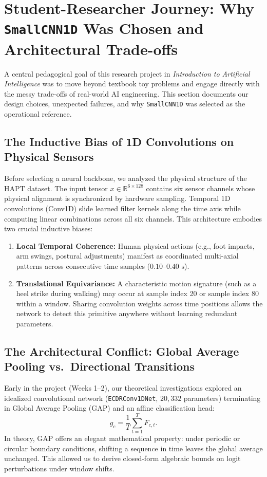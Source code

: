 \documentclass[journal,onecolumn,10pt]{IEEEtran}
\newcommand{\R}{\mathbb{R}}
\newcommand{\code}[1]{{\small\ttfamily\nolinkurl{#1}}}
\theoremstyle{remark}
\begin{document}
\section{Student-Researcher Journey: Why \code{SmallCNN1D} Was Chosen and Architectural Trade-offs}
A central pedagogical goal of this research project in \textit{Introduction to Artificial Intelligence} was to move beyond textbook toy problems and engage directly with the messy trade-offs of real-world AI engineering. This section documents our design choices, unexpected failures, and why \code{SmallCNN1D} was selected as the operational reference.

\subsection{The Inductive Bias of 1D Convolutions on Physical Sensors}
Before selecting a neural backbone, we analyzed the physical structure of the HAPT dataset. The input tensor $x \in \R^{6 \times 128}$ contains six sensor channels whose physical alignment is synchronized by hardware sampling. 
Temporal 1D convolutions (Conv1D) slide learned filter kernels along the time axis while computing linear combinations across all six channels. This architecture embodies two crucial inductive biases:
\begin{enumerate}[leftmargin=1.4em]
  \item \textbf{Local Temporal Coherence:} Human physical actions (e.g., foot impacts, arm swings, postural adjustments) manifest as coordinated multi-axial patterns across consecutive time samples ($0.10\text{--}0.40\text{ s}$).
  \item \textbf{Translational Equivariance:} A characteristic motion signature (such as a heel strike during walking) may occur at sample index 20 or sample index 80 within a window. Sharing convolution weights across time positions allows the network to detect this primitive anywhere without learning redundant parameters.
\end{enumerate}

\subsection{The Architectural Conflict: Global Average Pooling vs.\ Directional Transitions}
Early in the project (Weeks 1--2), our theoretical investigations explored an idealized convolutional network (\code{ECDRConv1DNet}, $20,332$ parameters) terminating in Global Average Pooling (GAP) and an affine classification head:
\begin{equation}
g_c = \frac{1}{T} \sum_{t=1}^T F_{c,t}.
\end{equation}
In theory, GAP offers an elegant mathematical property: under periodic or circular boundary conditions, shifting a sequence in time leaves the global average unchanged. This allowed us to derive closed-form algebraic bounds on logit perturbations under window shifts.
\end{document}
